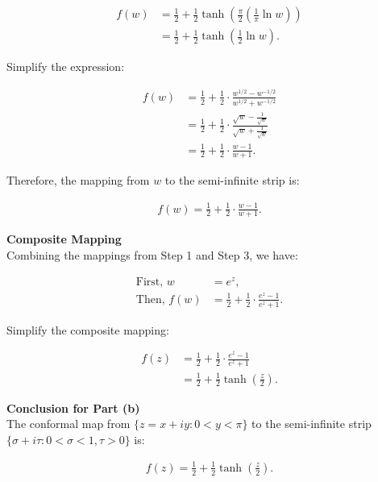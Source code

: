 \begin{example}
    \begin{align*}
        f(w) & = \frac{1}{2} + \frac{1}{2} \tanh\left( \frac{\pi}{2} \left( \frac{1}{\pi} \ln w \right) \right) \\
             & = \frac{1}{2} + \frac{1}{2} \tanh\left( \frac{1}{2} \ln w \right).
    \end{align*}

    Simplify the expression:

    \begin{align*}
        f(w) & = \frac{1}{2} + \frac{1}{2} \cdot \frac{w^{1/2} - w^{-1/2}}{w^{1/2} + w^{-1/2}}                       \\
             & = \frac{1}{2} + \frac{1}{2} \cdot \frac{\sqrt{w} - \frac{1}{\sqrt{w}}}{\sqrt{w} + \frac{1}{\sqrt{w}}} \\
             & = \frac{1}{2} + \frac{1}{2} \cdot \frac{w - 1}{w + 1}.
    \end{align*}

    Therefore, the mapping from $w$ to the semi-infinite strip is:

    \begin{align*}
        f(w) = \frac{1}{2} + \frac{1}{2} \cdot \frac{w - 1}{w + 1}.
    \end{align*}

    \textbf{Composite Mapping} \\

    Combining the mappings from Step 1 and Step 3, we have:

    \begin{align*}
        \text{First, } w   & = e^{z},                                                       \\
        \text{Then, } f(w) & = \frac{1}{2} + \frac{1}{2} \cdot \frac{e^{z} - 1}{e^{z} + 1}.
    \end{align*}

    Simplify the composite mapping:

    \begin{align*}
        f(z) & = \frac{1}{2} + \frac{1}{2} \cdot \frac{e^{z} - 1}{e^{z} + 1} \\
             & = \frac{1}{2} + \frac{1}{2} \tanh\left( \frac{z}{2} \right).
    \end{align*}

    \textbf{Conclusion for Part (b)} \\

    The conformal map from $\{ z = x + iy : 0 < y < \pi \}$ to the semi-infinite strip $\{ \sigma + i\tau : 0 < \sigma < 1, \tau > 0 \}$ is:

    \begin{align*}
        f(z) = \frac{1}{2} + \frac{1}{2} \tanh\left( \frac{z}{2} \right).
    \end{align*}

\end{example}


